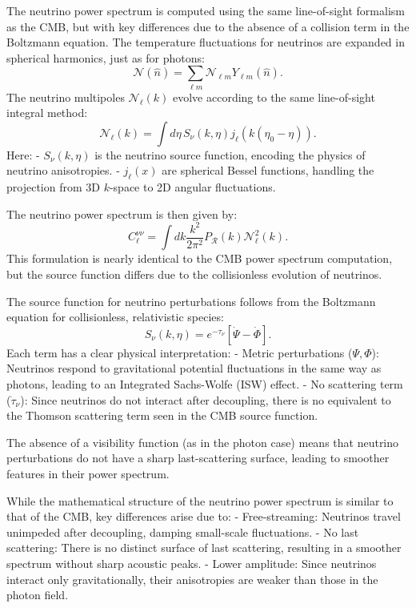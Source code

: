 \documentclass{aa}
\begin{document}
The neutrino power spectrum is computed using the same line-of-sight formalism as the CMB, but with key differences due to the absence of a collision term in the Boltzmann equation. The temperature fluctuations for neutrinos are expanded in spherical harmonics, just as for photons:
\begin{equation}
\mathcal{N}(\hat{n}) = \sum_{\ell m} \mathcal{N}_{\ell m} Y_{\ell m} (\hat{n}).
\end{equation}
The neutrino multipoles $\mathcal{N}_\ell(k)$ evolve according to the same line-of-sight integral method:
\begin{equation}
\mathcal{N}_\ell(k) = \int d\eta \, S_{\nu}(k, \eta) j_\ell(k (\eta_0 - \eta)).
\end{equation}
Here:
- $S_{\nu}(k, \eta)$ is the neutrino source function, encoding the physics of neutrino anisotropies.  
- $j_\ell(x)$ are spherical Bessel functions, handling the projection from 3D $k$-space to 2D angular fluctuations.  

The neutrino power spectrum is then given by:
\begin{equation}
C_\ell^{\nu\nu} = \int dk \frac{k^2}{2\pi^2} P_{\mathcal{R}}(k) \mathcal{N}_\ell^2(k).
\end{equation}
This formulation is nearly identical to the CMB power spectrum computation, but the source function differs due to the collisionless evolution of neutrinos.

The source function for neutrino perturbations follows from the Boltzmann equation for collisionless, relativistic species:
\begin{equation}
S_{\nu}(k, \eta) = e^{-\tau_\nu} \left[ \dot{\Psi} - \dot{\Phi} \right].
\end{equation}
Each term has a clear physical interpretation:
- Metric perturbations ($\Psi, \Phi$): Neutrinos respond to gravitational potential fluctuations in the same way as photons, leading to an Integrated Sachs-Wolfe (ISW) effect.
- No scattering term ($\dot{\tau}_\nu$): Since neutrinos do not interact after decoupling, there is no equivalent to the Thomson scattering term seen in the CMB source function.

The absence of a visibility function (as in the photon case) means that neutrino perturbations do not have a sharp last-scattering surface, leading to smoother features in their power spectrum.

While the mathematical structure of the neutrino power spectrum is similar to that of the CMB, key differences arise due to:
- Free-streaming: Neutrinos travel unimpeded after decoupling, damping small-scale fluctuations.
- No last scattering: There is no distinct surface of last scattering, resulting in a smoother spectrum without sharp acoustic peaks.
- Lower amplitude: Since neutrinos interact only gravitationally, their anisotropies are weaker than those in the photon field.
\end{document}
